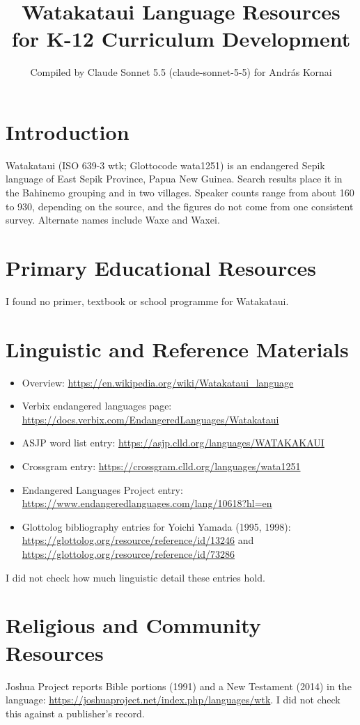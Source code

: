 \documentclass[12pt]{article}
\title{Watakataui Language Resources for K-12 Curriculum Development}
\author{Compiled by Claude Sonnet 5.5 (claude-sonnet-5-5) for Andr\'as Kornai}
\date{}
\begin{document}
\maketitle

\section{Introduction}
Watakataui (ISO 639-3 wtk; Glottocode wata1251) is an endangered Sepik language of East Sepik Province, Papua New Guinea. Search results place it in the Bahinemo grouping and in two villages. Speaker counts range from about 160 to 930, depending on the source, and the figures do not come from one consistent survey. Alternate names include Waxe and Waxei.

\section{Primary Educational Resources}
I found no primer, textbook or school programme for Watakataui.

\section{Linguistic and Reference Materials}
\begin{itemize}
\item Overview: \url{https://en.wikipedia.org/wiki/Watakataui_language}
\item Verbix endangered languages page: \url{https://docs.verbix.com/EndangeredLanguages/Watakataui}
\item ASJP word list entry: \url{https://asjp.clld.org/languages/WATAKAKAUI}
\item Crossgram entry: \url{https://crossgram.clld.org/languages/wata1251}
\item Endangered Languages Project entry: \url{https://www.endangeredlanguages.com/lang/10618?hl=en}
\item Glottolog bibliography entries for Yoichi Yamada (1995, 1998): \url{https://glottolog.org/resource/reference/id/13246} and \url{https://glottolog.org/resource/reference/id/73286}
\end{itemize}
I did not check how much linguistic detail these entries hold.

\section{Religious and Community Resources}
Joshua Project reports Bible portions (1991) and a New Testament (2014) in the language: \url{https://joshuaproject.net/index.php/languages/wtk}. I did not check this against a publisher's record.
\end{document}
